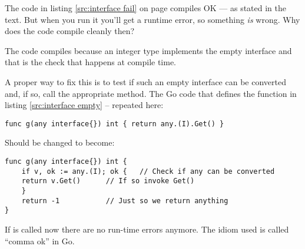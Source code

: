 \begin{Exercise}[title={Interfaces and compilation},difficulty=6]
\Question
The code in listing \ref{src:interface fail} on page
\pageref{src:interface fail} compiles OK --- as stated 
in the text. But when you run it you'll get a runtime error, so
something \emph{is} wrong. Why does the code compile cleanly then?
\end{Exercise}

\begin{Answer}
\Question
The code compiles because an integer type implements the empty interface
and that is the check that happens at compile time.

A proper way to fix this is to test if such an empty interface can
be converted and, if so, call the appropriate method. The Go code
that defines the function  in listing \ref{src:interface empty}
-- repeated here:
\begin{lstlisting}
func g(any interface{}) int { return any.(I).Get() }
\end{lstlisting}

\noindent{}Should be changed to become:
\begin{lstlisting}
func g(any interface{}) int {
    if v, ok := any.(I); ok {	// Check if any can be converted
	return v.Get()		// If so invoke Get()
    }
    return -1			// Just so we return anything
}
\end{lstlisting}
If  is called now there are no run-time errors anymore. The
idiom used is called ``comma ok'' in Go.
\end{Answer}
